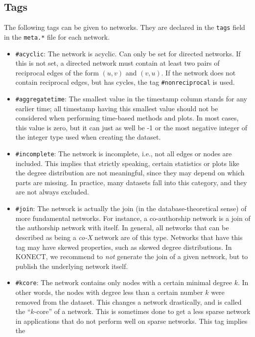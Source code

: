 \documentclass{article}
\begin{document}
\subsection{Tags}
\label{sec:tags}
The following tags can be given to networks.  They are declared in the
\texttt{tags} field in the \texttt{meta.*} file for each network. 
\begin{itemize}
\item \texttt{\#acyclic}:  The network is acyclic.  Can only be
  set for directed networks.  If this is not set, a directed
  network must contain at least two pairs of reciprocal edges of
  the form $(u,v)$ and $(v,u)$.  If the network does not contain
  reciprocal edges, but has cycles, the tag
  \texttt{\#nonreciprocal} is used.
\item \texttt{\#aggregatetime}:  The smallest value in the timestamp column
  stands for any earlier time; all timestamp having this smallest value should not be
  considered when performing time-based methods and plots.  In most
  cases, this value is zero, but it can just as well be -1 or the most
  negative integer of the integer type used when creating the dataset. 
\item \texttt{\#incomplete}: The network is incomplete, i.e.,
  not all edges or nodes are included.  This implies that
  strictly speaking, certain statistics or plots like 
  the degree distribution are not meaningful, since they may
  depend on which parts are missing.  In practice, many datasets
  fall into this category, and they are not always excluded. 
\item \texttt{\#join}:  The network is actually the join (in the
  database-theoretical sense) of more
  fundamental networks.  For instance, a co-authorship network
  is a join of the authorship network with itself.  In general, all
  networks that can be described as being a \emph{co-X} network are of
  this type. 
  Networks that have this tag may have skewed properties, such as skewed
  degree distributions.  In KONECT, we recommend to \emph{not} generate
  the join of a given network, but to publish the underlying network itself. 
\item \texttt{\#kcore}: The network contains only nodes with a
  certain minimal degree $k$. In other words, the nodes with
  degree less than a certain number $k$ were removed from the
  dataset.  This changes a network drastically, and is called
  the ``$k$-core'' of a network. This is sometimes done to get
  a less sparse network in applications that do not perform well
  on sparse networks. This tag implies the

\end{itemize}
\end{document}
